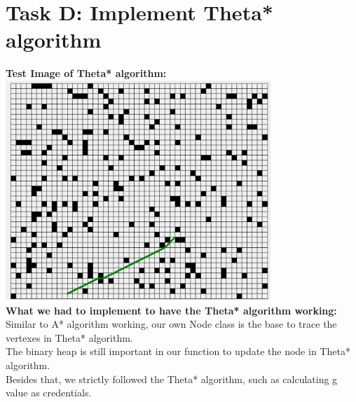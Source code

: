 \documentclass[12pt, letterpaper]{article}
\begin{document}
\section{Task D: Implement Theta* algorithm}
\textbf{Test Image of Theta* algorithm:}\\
\includegraphics[width=10cm]{1c-Thetatest}\\
\textbf{What we had to implement to have the Theta* algorithm working:}\\
Similar to A* algorithm working, our own Node class is the base to trace the vertexes in Theta* algorithm.\\
The binary heap is still important in our function to update the node in Theta* algorithm.\\
Besides that, we strictly followed the Theta* algorithm, such as calculating g value as credentials.\\
\end{document}
